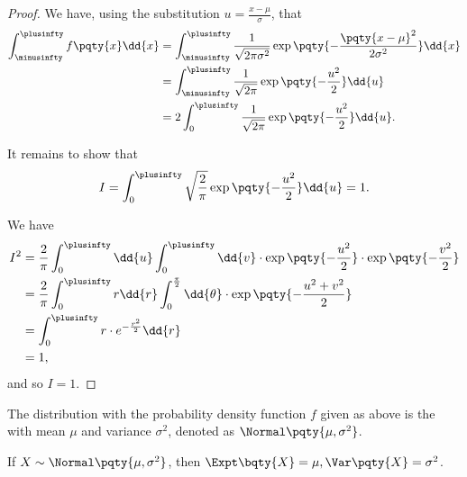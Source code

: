 \begin{proof}
    We have, using the substitution \(u = \frac{x - \mu}{\sigma}\), that
    \begin{align*}
        \int_{\minusinfty}^{\plusinfty} f\pqty{x} \dd{x} &= \int_{\minusinfty}^{\plusinfty} \frac{1}{\sqrt{2 \pi \sigma^2}} \exp\pqty{-\frac{\pqty{x - \mu}^2}{2 \sigma^2}} \dd{x} \\
        &= \int_{\minusinfty}^{\plusinfty} \frac{1}{\sqrt{2 \pi}} \exp\pqty{- \frac{u^2}{2}} \dd{u} \\
        &= 2 \int_{0}^{\plusinfty} \frac{1}{\sqrt{2 \pi}} \exp\pqty{- \frac{u^2}{2}} \dd{u}.
    \end{align*}

    It remains to show that
    \[
        I = \int_{0}^{\plusinfty} \sqrt{\frac{2}{\pi}} \exp\pqty{- \frac{u^2}{2}} \dd{u} = 1.
    \]

    We have
    \begin{align*}
        I^2 &= \frac{2}{\pi} \int_{0}^{\plusinfty} \dd{u} \int_{0}^{\plusinfty} \dd{v} \cdot \exp\pqty{- \frac{u^2}{2}} \cdot \exp\pqty{- \frac{v^2}{2}} \\
        &= \frac{2}{\pi} \int_{0}^{\plusinfty} r \dd{r} \int_{0}^{\frac{\pi}{2}} \dd{\theta} \cdot \exp\pqty{- \frac{u^2 + v^2}{2}} \\
        &= \int_{0}^{\plusinfty} r \cdot e^{-\frac{r^2}{2}} \dd{r} \\
        &= 1,
    \end{align*}
    and so \(I = 1\).
\end{proof}

\begin{definition}
    \label{def:normal}%
    The distribution with the probability density function \(f\) given as above is the  with mean \(\mu\) and variance \(\sigma^2\), denoted as \(\Normal\pqty{\mu, \sigma^2}\).
\end{definition}

\begin{proposition}
    \label{prop:mean-variance-normal}%
    If \(X \sim \Normal\pqty{\mu, \sigma^2}\), then \(\Expt\bqty{X} = \mu, \Var\pqty{X} = \sigma^2\).
\end{proposition}


